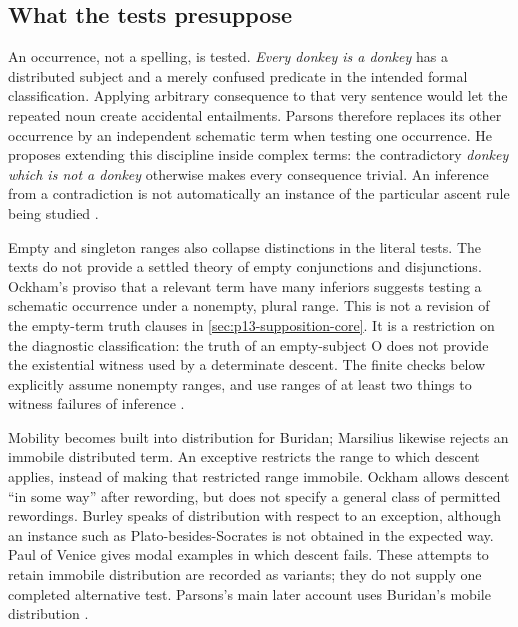 \subsection{What the tests presuppose}
\label{sec:p13-supposition-descent-limits}

An occurrence, not a spelling, is tested. \emph{Every donkey is a
donkey} has a distributed subject and a merely confused predicate in
the intended formal classification. Applying arbitrary consequence to
that very sentence would let the repeated noun create accidental
entailments. Parsons therefore replaces its other occurrence by an
independent schematic term when testing one occurrence. He proposes
extending this discipline inside complex terms: the contradictory
\emph{donkey which is not a donkey} otherwise makes every consequence
trivial. An inference from a contradiction is not automatically an
instance of the particular ascent rule being studied
\cite[pp.~246--248]{Parsons2007FordhamSupposition}.

Empty and singleton ranges also collapse distinctions in the literal
tests. The texts do not provide a settled theory of empty conjunctions
and disjunctions. Ockham's proviso that a relevant term have many
inferiors suggests testing a schematic occurrence under a nonempty,
plural range. This is not a revision of the empty-term truth clauses
in \cref{sec:p13-supposition-core}. It is a restriction on the
diagnostic classification: the truth of an empty-subject O does not
provide the existential witness used by a determinate descent. The
finite checks below explicitly assume nonempty ranges, and use ranges
of at least two things to witness failures of inference
\cite[pp.~248--249]{Parsons2007FordhamSupposition}.

Mobility becomes built into distribution for Buridan; Marsilius likewise
rejects an immobile distributed term. An exceptive restricts the range
to which descent applies, instead of making that restricted range
immobile. Ockham allows descent ``in some way'' after rewording, but
does not specify a general class of permitted rewordings. Burley speaks
of distribution with respect to an exception, although an instance such
as Plato-besides-Socrates is not obtained in the expected way. Paul of
Venice gives modal examples in which descent fails. These attempts to
retain immobile distribution are recorded as variants; they do not
supply one completed alternative test. Parsons's main later account
uses Buridan's mobile distribution
\cite[pp.~249--250]{Parsons2007FordhamSupposition}.

